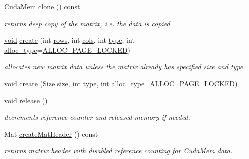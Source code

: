 \begin{DoxyCompactItemize}
\item 
\hyperlink{classcv_1_1gpu_1_1CudaMem}{Cuda\-Mem} \hyperlink{classcv_1_1gpu_1_1CudaMem_af36c83182073fff8e1ef61ac7cfcf027}{clone} () const 
\begin{DoxyCompactList}\small\item\em returns deep copy of the matrix, i.\-e. the data is copied \end{DoxyCompactList}\item 
\hyperlink{legacy_8hpp_a8bb47f092d473522721002c86c13b94e}{void} \hyperlink{classcv_1_1gpu_1_1CudaMem_a5a8445ccfa3608701e8a04ecc69cbf6c}{create} (int \hyperlink{classcv_1_1gpu_1_1CudaMem_a7a9d3e9cac593f025c71e86a4e855f15}{rows}, int \hyperlink{classcv_1_1gpu_1_1CudaMem_ac0ebd6815d262974d6fb1b6fa79fe360}{cols}, int \hyperlink{classcv_1_1gpu_1_1CudaMem_a9c4563cc629d2ccbe8397f85015db109}{type}, int \hyperlink{classcv_1_1gpu_1_1CudaMem_a253dcb37318ea0b109dca064678b88e0}{alloc\-\_\-type}=\hyperlink{classcv_1_1gpu_1_1CudaMem_a1bb680556fac1e3a41bd00e1c8cf6818a766dff008ee80639564c9ceaa7b2936b}{A\-L\-L\-O\-C\-\_\-\-P\-A\-G\-E\-\_\-\-L\-O\-C\-K\-E\-D})
\begin{DoxyCompactList}\small\item\em allocates new matrix data unless the matrix already has specified size and type. \end{DoxyCompactList}\item 
\hyperlink{legacy_8hpp_a8bb47f092d473522721002c86c13b94e}{void} \hyperlink{classcv_1_1gpu_1_1CudaMem_a83eda64ed12d04789d62e8842a607482}{create} (Size \hyperlink{classcv_1_1gpu_1_1CudaMem_a5d79b4ec776ed1de0053ecd30b7b8b73}{size}, int \hyperlink{classcv_1_1gpu_1_1CudaMem_a9c4563cc629d2ccbe8397f85015db109}{type}, int \hyperlink{classcv_1_1gpu_1_1CudaMem_a253dcb37318ea0b109dca064678b88e0}{alloc\-\_\-type}=\hyperlink{classcv_1_1gpu_1_1CudaMem_a1bb680556fac1e3a41bd00e1c8cf6818a766dff008ee80639564c9ceaa7b2936b}{A\-L\-L\-O\-C\-\_\-\-P\-A\-G\-E\-\_\-\-L\-O\-C\-K\-E\-D})
\item 
\hyperlink{legacy_8hpp_a8bb47f092d473522721002c86c13b94e}{void} \hyperlink{classcv_1_1gpu_1_1CudaMem_a45fb03b3ba66cb4a784a44d777ae1e25}{release} ()
\begin{DoxyCompactList}\small\item\em decrements reference counter and released memory if needed. \end{DoxyCompactList}\item 
Mat \hyperlink{classcv_1_1gpu_1_1CudaMem_a588489fa2732303f4e21f851d7784d7d}{create\-Mat\-Header} () const 
\begin{DoxyCompactList}\small\item\em returns matrix header with disabled reference counting for \hyperlink{classcv_1_1gpu_1_1CudaMem}{Cuda\-Mem} data. \end{DoxyCompactList}\item 

\end{DoxyCompactItemize}

